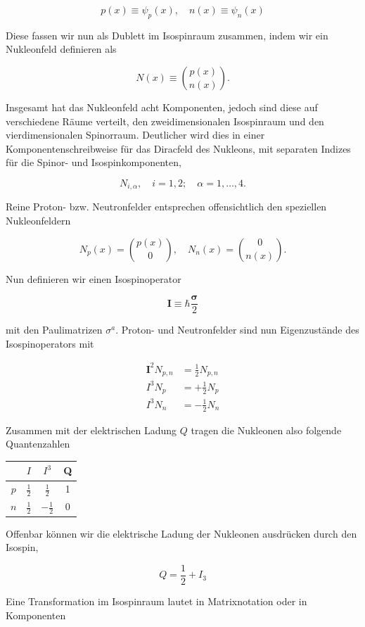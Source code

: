\documentclass[10pt, letterpaper]{article}
\begin{document}
$$
p(x) \equiv \psi_{p}(x), \quad n(x) \equiv \psi_{n}(x)
$$

Diese fassen wir nun als Dublett im Isospinraum zusammen, indem wir ein Nukleonfeld definieren als

$$
N(x) \equiv\binom{p(x)}{n(x)} .
$$

Insgesamt hat das Nukleonfeld acht Komponenten, jedoch sind diese auf verschiedene Räume verteilt, den zweidimensionalen Isospinraum und den vierdimensionalen Spinorraum. Deutlicher wird dies in einer Komponentenschreibweise für das Diracfeld des Nukleons, mit separaten Indizes für die Spinor- und Isospinkomponenten,

$$
N_{i, \alpha}, \quad i=1,2 ; \quad \alpha=1, \ldots, 4 .
$$

Reine Proton- bzw. Neutronfelder entsprechen offensichtlich den speziellen Nukleonfeldern

$$
N_{p}(x)=\binom{p(x)}{0}, \quad N_{n}(x)=\binom{0}{n(x)} .
$$

Nun definieren wir einen Isospinoperator

$$
\mathbf{I} \equiv \hbar \frac{\boldsymbol{\sigma}}{2}
$$

mit den Paulimatrizen $\sigma^{a}$. Proton- und Neutronfelder sind nun Eigenzustände des Isospinoperators mit

$$
\begin{aligned}
\mathbf{I}^{2} N_{p, n} & =\frac{1}{2} N_{p, n} \\
I^{3} N_{p} & =+\frac{1}{2} N_{p} \\
I^{3} N_{n} & =-\frac{1}{2} N_{n}
\end{aligned}
$$

Zusammen mit der elektrischen Ladung $Q$ tragen die Nukleonen also folgende Quantenzahlen

\begin{center}
\begin{tabular}{c|ccc}
 & $I$ & $I^{3}$ & Q \\
\hline
$p$ & $\frac{1}{2}$ & $\frac{1}{2}$ & 1 \\
$n$ & $\frac{1}{2}$ & $-\frac{1}{2}$ & 0 \\
\end{tabular}
\end{center}

Offenbar können wir die elektrische Ladung der Nukleonen ausdrücken durch den Isospin,

$$
Q=\frac{1}{2}+I_{3}
$$

Eine Transformation im Isospinraum lautet in Matrixnotation oder in Komponenten
\end{document}

